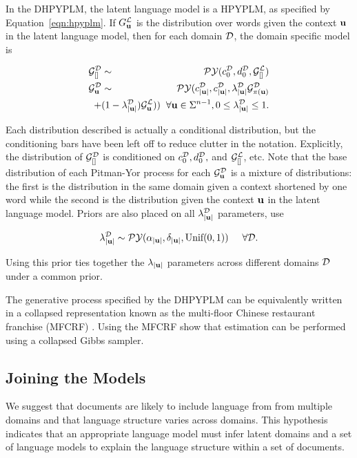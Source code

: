 In the DHPYPLM, the latent language model is a HPYPLM, as specified by Equation~\ref{eqn:hpyplm}.  If $G^\LA_\bu$ is the distribution over words given the context $\bu$ in the latent language model, then for each domain $\D$,  the domain specific model is

\begin{eqnarray}
\G^\D_{[]} &\sim& \PY(c^\D_0, d^\D_0,\G^\LA_{[]}) \nonumber \\
\G^\D_\bu &\sim& \PY(c^\D_{|\bu|}, c^\D_{|\bu|}, \lambda^\D_{|\bu|}\G^\D_{\pi(\bu)} \nonumber \\
&& \hspace{-1cm} + (1-\lambda^\D_{|\bu|})\G^\LA_\bu))  \hspace{.2cm} \forall \bu \in \Sigma^{n-1}, 0 \leq \lambda^\D_{|\bu|} \leq 1. \nonumber
\end{eqnarray}

Each distribution described is actually a conditional distribution, but the conditioning bars have been left off to reduce clutter in the notation.  Explicitly, the distribution of $\G^\D_{[]}$ is conditioned on $c^\D_0, d^\D_0,$ and $\G^\LA_{[]}$, etc.  Note that the base distribution of each Pitman-Yor process for each $\G^\D_\bu$ is a mixture of distributions: the first is the distribution in the same domain given a context shortened by one word while the second is the distribution given the context $\bu$ in the latent language model. Priors are also placed on all $\lambda^\D_{|\bu|}$ parameters, \cite{Wood2009a} use

$$\lambda^\D_{|\bu|} \sim \PY(\alpha_{|\bu|}, \delta_{|\bu|}, \textrm{Unif}(0,1))  \hspace{.5cm} \forall \D.$$

Using this prior ties together the $\lambda_{|\bu|}$ parameters across different domains $\D$ under a common prior.

The generative process specified by the  DHPYPLM can be equivalently written in a collapsed representation known as the multi-floor Chinese restaurant franchise (MFCRF) \cite{Wood2009a}.  Using the MFCRF \cite{Wood2009a} show that estimation can be performed using a collapsed Gibbs sampler.

\subsection{Joining the Models}

We suggest that documents are likely to include language from from multiple domains and that language structure varies across domains. This hypothesis indicates that an appropriate language model must infer latent domains and a set of language models to explain the language structure within a set of documents.

